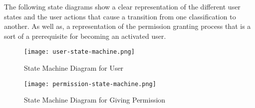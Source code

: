 The following state diagrams show a clear representation of the different user states and the user actions that cause a transition from one classification to another. As well as, a representation of the permission granting process that is a sort of a prerequisite for becoming an activated user.


\begin{figure}[H]
\caption{State Machine Diagram for User}
\label{fig:ms-user}
\centering
\texttt{[image: user-state-machine.png]}
\end{figure}

\begin{figure}[H]
\caption{State Machine Diagram for Giving Permission}
\label{fig:ms-giving-permission}
\centering
\texttt{[image: permission-state-machine.png]}
\end{figure}